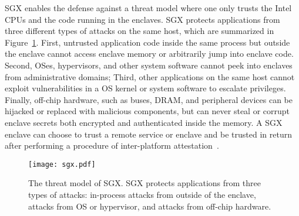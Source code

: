 
SGX enables the defense against a threat model where one only trusts the Intel CPUs and the 
code running in the enclaves.
SGX protects applications from three different types of attacks on the same host, which are summarized in Figure~\ref{fig:sgx:threats}. First, untrusted application code inside the same process but outside the enclave
cannot access enclave memory or arbitrarily jump into enclave code. Second, OSes, hypervisors, and other system software cannot peek into enclaves from administrative domains;
Third, other applications on the same host
cannot exploit vulnerabilities in a OS kernel or system software
to escalate privileges.
Finally, off-chip hardware, such as buses, DRAM, and peripheral devices can be hijacked or replaced with malicious components, but can never steal or corrupt enclave secrets
both encrypted and authenticated inside the memory. 
A SGX enclave can choose to trust a remote service or enclave and be trusted in return
after performing a procedure of inter-platform attestation~\cite{sgx-attestation}.


\begin{figure}[t!]
\centering
\texttt{[image: sgx.pdf]}
\caption{The threat model of SGX. SGX protects applications
from three types of attacks:
in-process attacks from outside of the enclave,
attacks from OS or hypervisor, and attacks from off-chip hardware.}
\label{fig:sgx:threats}
\end{figure}



